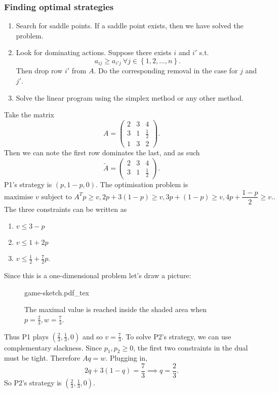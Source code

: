 \documentclass[a4paper]{scrartcl}
\newcommand{\incfig}[2]{%
    \def\svgwidth{#1mm}
    {#2.pdf_tex}
}
\begin{document}
\subsubsection{Finding optimal strategies}
\begin{enumerate}
	\item Search for saddle points. If a saddle point exists, then we have solved the problem.
	\item Look for dominating actions. Suppose there exists $i$ and $i'$ s.t. \[
	a_{ij} \geq a_{i'j} \ \forall j \in \left\{1,2,\ldots ,n\right\}
	.\] 
	Then drop row $i'$ from $A$. Do the corresponding removal in the case for $j$ and $j'$.
	\item Solve the linear program using the simplex method or any other method.
\end{enumerate}
\begin{example}
	Take the matrix \[
	A=\begin{pmatrix} 2&3&4\\3&1&\frac{1}{2}\\1&3&2 \end{pmatrix}
	.\] Then we can note the first row dominates the last, and as such \[
	\tilde{A}=\begin{pmatrix} 2&3&4\\3&1&\frac{1}{2} \end{pmatrix}
	.\] 
	P1's strategy is $(p,1-p,0)$. The optimisation problem is \[
	\text{maximise } v \text{ subject to } A^{T}p \geq v, 2p+ 3 (1-p) \geq v, 3p+(1-p) \geq v, 4p + \frac{1-p}{2}\geq v.
	.\] The three constraints can be written as 
	\begin{enumerate}
		\item $v \leq 3-p$ 
		\item $v \leq 1+2p$ 
		\item $v \leq \frac{1}{2}+\frac{7}{2}p$.
	\end{enumerate}
	Since this is a one-dimensional problem let's draw a picture:
	\begin{figure}[H]
		\centering
		\incfig{70}{game-sketch}
		\caption{The maximal value is reached inside the shaded area when $p=\frac{2}{3}, w=\frac{7}{3}$.}
	\end{figure}
	Thus P1 plays $(\frac{2}{3},\frac{1}{3},0)$ and so $v=\frac{7}{3}$. To solve P2's strategy, we can use complementary slackness. Since $p_1 ,p_2 \geq 0$, the first two constraints in the dual must be tight. Therefore $Aq=w$. Plugging in, \[
	2q+3 (1-q)=\frac{7}{3} \implies q=\frac{2}{3}
	.\] So P2's strategy is $(\frac{2}{3},\frac{1}{3},0)$.
\end{example}
\end{document}
